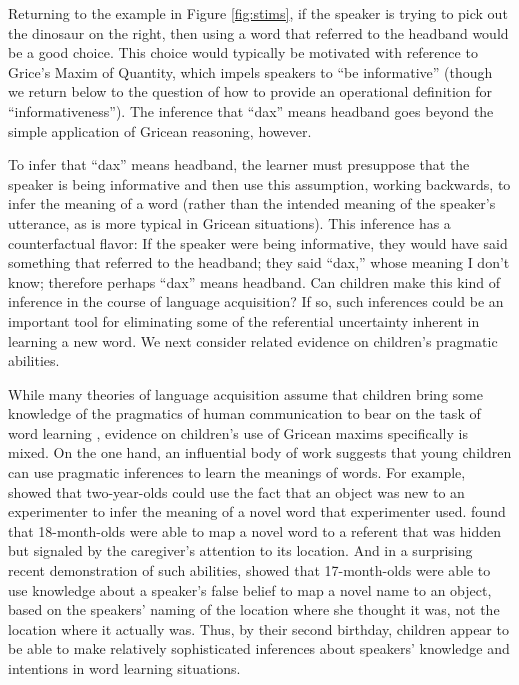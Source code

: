 \documentclass[review]{elsarticle}
\begin{document}
Returning to the example in Figure \ref{fig:stims}, if the speaker is trying to pick out the dinosaur on the right, then using a word that referred to the {\sc headband} would be a good choice. This choice would typically be motivated with reference to Grice's Maxim of Quantity, which impels speakers to ``be informative'' (though we return below to the question of how to provide an operational definition for ``informativeness''). The inference that ``dax'' means {\sc headband} goes beyond the simple application of Gricean reasoning, however. 

To infer that ``dax'' means {\sc headband}, the learner must presuppose that the speaker is being informative and then use this assumption, working backwards, to infer the meaning of a word (rather than the intended meaning of the speaker's utterance, as is more typical in Gricean situations). This inference has a counterfactual flavor: If the speaker were being informative, they would have said something that referred to the {\sc headband}; they said ``dax,'' whose meaning I don't know; therefore perhaps ``dax'' means {\sc headband}. Can children make this kind of inference in the course of language acquisition? If so, such inferences could be an important tool for eliminating some of the referential uncertainty inherent in learning a new word. We next consider related evidence on children's pragmatic abilities.

While many theories of language acquisition assume that children bring some knowledge of the pragmatics of human communication to bear on the task of word learning \citep{bloom2002,clark2003,tomasello2003}, evidence on children's use of Gricean maxims specifically is mixed. On the one hand, an influential body of work suggests that young children can use pragmatic inferences to learn the meanings of words. For example, \citet{akhtar1996} showed that two-year-olds could use the fact that an object was new to an experimenter to infer the meaning of a novel word that experimenter used. \citet{baldwin1993} found that 18-month-olds were able to map a novel word to a referent that was hidden but signaled by the caregiver's attention to its location. And in a surprising recent demonstration of such abilities, \citet{southgate2010} showed that 17-month-olds were able to use knowledge about a speaker's false belief to map a novel name to an object, based on the speakers' naming of the location where she thought it was, not the location where it actually was. Thus, by their second birthday, children appear to be able to make relatively sophisticated inferences about speakers' knowledge and intentions in word learning situations.
\end{document}
